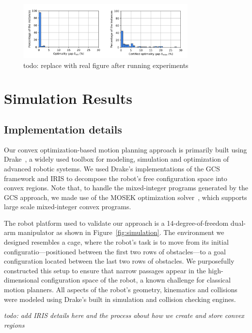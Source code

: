 \begin{figure}[!tbh]
    \centering
    \includegraphics[width=0.8\textwidth]{figures/optimality_gap.png}
    \captionsetup{justification=centering}
    \caption{ {\color{red} todo: replace with real figure after running experiments} }
    \label{fig:}
\end{figure}

\section{Simulation Results}\label{sec:results}

\subsection{Implementation details}

Our convex optimization-based motion planning approach is primarily built using Drake~\cite{drake}, a widely used toolbox for modeling, simulation and optimization of advanced robotic systems.
We used Drake's implementations of the GCS framework and IRIS to decompose the robot's free configuration space into convex regions.
Note that, to handle the mixed-integer programs generated by the GCS approach, we made use of the MOSEK optimization solver~\cite{mosek}, which supports large scale mixed-integer convex programs.

The robot platform used to validate our approach is a 14-degree-of-freedom dual-arm manipulator as shown in Figure~\ref{fig:simulation}.
The environment we designed resembles a cage, where the robot's task is to move from its initial configuratio---positioned between the first two rows of obstacles---to a goal configuration located between the last two rows of obstacles.
We purposefully constructed this setup to ensure that narrow passages appear in the high-dimensional configuration space of the robot, a known challenge for classical motion planners.
All aspects of the robot's geometry, kinematics and collisions were modeled using Drake's built in simulation and collision checking engines.

{\color{red} \textit{todo: add IRIS details here and the process about how we create and store convex regions}}

